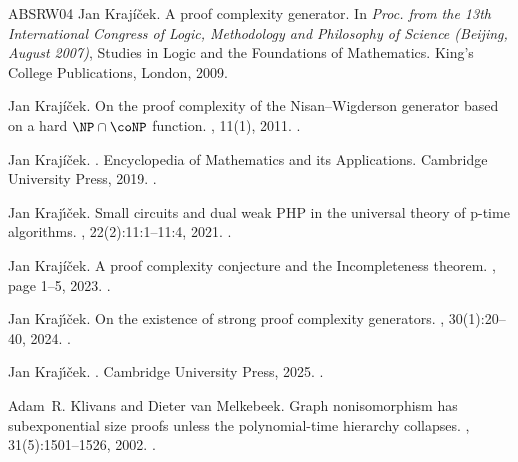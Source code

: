 \documentclass[10pt,a4paper]{article}
\theoremstyle{definition}
\theoremstyle{remark}
\begin{document}
\begin{thebibliography}{ABSRW04}
Jan Kraj\'{i}\v{c}ek.
\newblock A proof complexity generator.
\newblock In {\em Proc. from the 13th International Congress of Logic,
  Methodology and Philosophy of Science (Beijing, August 2007)}, Studies in
  Logic and the Foundations of Mathematics. King's College Publications,
  London, 2009.

Jan Kraj{\'i}ček.
\newblock On the proof complexity of the {N}isan--{W}igderson generator based
  on a hard {$\NP\cap\coNP$} function.
, 11(1), 2011.
\newblock \href {https://doi.org/10.1142/S0219061311000979}
  {}.

Jan Krajíček.
.
\newblock Encyclopedia of Mathematics and its Applications. Cambridge
  University Press, 2019.
\newblock \href {https://doi.org/10.1017/9781108242066}
  {}.

Jan Kraj{\'{\i}}ček.
\newblock Small circuits and dual weak {PHP} in the universal theory of p-time
  algorithms.
, 22(2):11:1--11:4, 2021.
\newblock \href {https://doi.org/10.1145/3446207} {}.

Jan Kraj{\'i}ček.
\newblock A proof complexity conjecture and the {I}ncompleteness theorem.
, page 1–5, 2023.
\newblock \href {https://doi.org/10.1017/jsl.2023.69}
  {}.

Jan Kraj{\'\i}{\v{c}}ek.
\newblock On the existence of strong proof complexity generators.
, 30(1):20--40, 2024.
\newblock \href {https://doi.org/10.1017/bsl.2023.40}
  {}.

Jan Kraj{\'{\i}}ček.
.
\newblock Cambridge University Press, 2025.
\newblock \href {https://doi.org/10.1017/9781009611664}
  {}.

Adam~R. Klivans and Dieter van Melkebeek.
\newblock Graph nonisomorphism has subexponential size proofs unless the
  polynomial-time hierarchy collapses.
, 31(5):1501--1526, 2002.
\newblock \href {https://doi.org/10.1137/S0097539700389652}
  {}.


\end{thebibliography}
\end{document}
